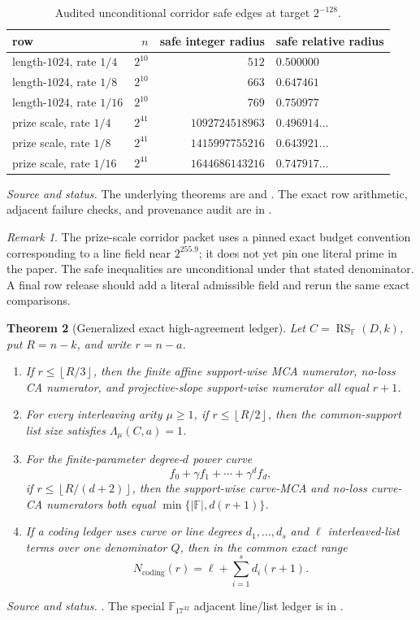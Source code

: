 \documentclass[11pt,a4paper]{amsart}
\numberwithin{equation}{section}
\newtheorem{theorem}{Theorem}[section]
\theoremstyle{remark}
\newtheorem{remark}[theorem]{Remark}
\DeclareMathOperator{\RS}{RS}
\newcommand{\F}{\mathbb F}
\newcommand{\abs}[1]{\lvert#1\rvert}
\newcommand{\floor}[1]{\left\lfloor#1\right\rfloor}
\newcommand{\source}[1]{\par\smallskip\noindent\textit{Source and status.} #1\par}
\begin{document}
\begin{table}[ht]
\centering
\caption{Audited unconditional corridor safe edges at target $2^{-128}$.}
\label{tab:corridor}
\small
\begin{tabularx}{\textwidth}{@{}l r r X@{}}
\toprule
row & $n$ & safe integer radius & safe relative radius\\
\midrule
length-$1024$, rate $1/4$ & $2^{10}$ & $512$ & $0.500000$\\
length-$1024$, rate $1/8$ & $2^{10}$ & $663$ & $0.647461$\\
length-$1024$, rate $1/16$& $2^{10}$ & $769$ & $0.750977$\\
prize scale, rate $1/4$ & $2^{41}$ & $1092724518963$ & $0.496914\ldots$\\
prize scale, rate $1/8$ & $2^{41}$ & $1415997755216$ & $0.643921\ldots$\\
prize scale, rate $1/16$& $2^{41}$ & $1644686143216$ & $0.747917\ldots$\\
\bottomrule
\end{tabularx}
\end{table}
\source{The underlying theorems are \cite[Theorem~3]{GKL24} and \cite[Theorem~2]{Hab25}.  The exact row arithmetic, adjacent failure checks, and provenance audit are in \cite{Corridor26}.}
\begin{remark}
The prize-scale corridor packet uses a pinned exact budget convention corresponding to a line field near $2^{255.9}$; it does not yet pin one literal prime in the paper.  The safe inequalities are unconditional under that stated denominator.  A final row release should add a literal admissible field and rerun the same exact comparisons.
\end{remark}

\begin{theorem}[Generalized exact high-agreement ledger]\label{thm:high-ledger}
Let $C=\RS_{\F}(D,k)$, put $R=n-k$, and write $r=n-a$.
\begin{enumerate}[label=\textup{(\roman*)},leftmargin=*]
\item If $r\le\floor{R/3}$, then the finite affine support-wise MCA numerator, no-loss CA numerator, and projective-slope support-wise numerator all equal $r+1$.
\item For every interleaving arity $\mu\ge1$, if $r\le\floor{R/2}$, then the common-support list size satisfies $\Lambda_\mu(C,a)=1$.
\item For the finite-parameter degree-$d$ power curve
\[
 f_0+\gamma f_1+\cdots+\gamma^df_d,
\]
if $r\le\floor{R/(d+2)}$, then the support-wise curve-MCA and no-loss curve-CA numerators both equal $\min\{\abs\F,d(r+1)\}$.
\item If a coding ledger uses curve or line degrees $d_1,\ldots,d_s$ and $\ell$ interleaved-list terms over one denominator $Q$, then in the common exact range
\[
 N_{\mathrm{coding}}(r)=\ell+\sum_{i=1}^s d_i(r+1).
\]
\end{enumerate}
\end{theorem}
\source{\cite{HighLedger26}.  The special $\mathbb F_{17^{32}}$ adjacent line/list ledger is in \cite{F17Threshold26}.}
\end{document}
